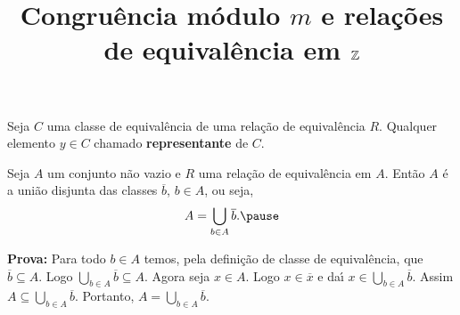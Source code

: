 \documentclass{beamer}
\title{Congruência módulo $m$ e rela\c{c}\~oes de equival\^encia em $\mathbb{Z}$}
\author[\autor]{\autor}
\institute[\instituto]{\instituto}
\date{}
\begin{document}
    \begin{frame}
        \maketitle
    \end{frame}


    \begin{frame}
        \begin{definicao}
            Seja $C$ uma classe de equival{\^e}ncia \pause de uma rela{\c c}{\~a}o de equival{\^e}ncia $R$. \pause Qualquer elemento $y\in C$  chamado \textbf{representante} de $C$.\pause
        \end{definicao}

        \begin{proposicao}
            Seja $A$ um conjunto n{\~a}o vazio \pause e $R$ uma rela{\c c}{\~a}o de equival{\^e}ncia em $A$. \pause Ent{\~a}o $A$ {\'e} a uni{\~a}o disjunta das classes $\overline{b}$, $b \in A$, ou seja,\pause
            \[
                A = \bigcup_{b\in A}\overline{b}.\pause
            \]
        \end{proposicao}
        \noindent\textbf{Prova:}
            Para todo $b\in A$ temos, \pause pela defini\c{c}\~ao de classe de equival\^encia, que $\overline{b}\subseteq A$. \pause Logo $\bigcup_{b\in A}\overline{b}\subseteq A$. \pause Agora seja $x\in A$. \pause Logo $x \in \overline{x}$ \pause e da{\'\i} $x\in \bigcup_{b\in A}\overline{b}$. \pause Assim $A\subseteq\bigcup_{b\in A}\overline{b}$. \pause Portanto, $A=\bigcup_{b\in A}\overline{b}$.\hspace{.5cm}\qedsymbol\pause
    \end{frame}

    \begin{frame}

    \end{frame}
\end{document}
